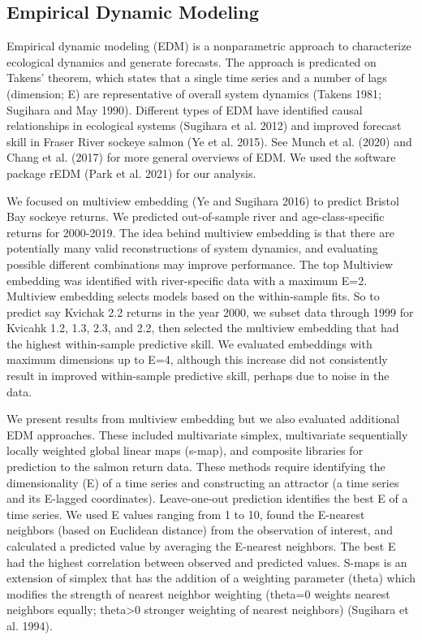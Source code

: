 \documentclass[
]{article}
\begin{document}
\hypertarget{empirical-dynamic-modeling}{%
\subsection*{Empirical Dynamic Modeling}\label{empirical-dynamic-modeling}}

Empirical dynamic modeling (EDM) is a nonparametric approach to characterize ecological dynamics and generate forecasts. The approach is predicated on Takens' theorem, which states that a single time series and a number of lags (dimension; E) are representative of overall system dynamics (Takens 1981; Sugihara and May 1990). Different types of EDM have identified causal relationships in ecological systems (Sugihara et al. 2012) and improved forecast skill in Fraser River sockeye salmon (Ye et al. 2015). See Munch et al. (2020) and Chang et al. (2017) for more general overviews of EDM. We used the software package rEDM (Park et al. 2021) for our analysis.

We focused on multiview embedding (Ye and Sugihara 2016) to predict Bristol Bay sockeye returns. We predicted out-of-sample river and age-class-specific returns for 2000-2019. The idea behind multiview embedding is that there are potentially many valid reconstructions of system dynamics, and evaluating possible different combinations may improve performance. The top Multiview embedding was identified with river-specific data with a maximum E=2. Multiview embedding selects models based on the within-sample fits. So to predict say Kvichak 2.2 returns in the year 2000, we subset data through 1999 for Kvicahk 1.2, 1.3, 2.3, and 2.2, then selected the multiview embedding that had the highest within-sample predictive skill. We evaluated embeddings with maximum dimensions up to E=4, although this increase did not consistently result in improved within-sample predictive skill, perhaps due to noise in the data.

We present results from multiview embedding but we also evaluated additional EDM approaches. These included multivariate simplex, multivariate sequentially locally weighted global linear maps (s-map), and composite libraries for prediction to the salmon return data. These methods require identifying the dimensionality (E) of a time series and constructing an attractor (a time series and its E-lagged coordinates). Leave-one-out prediction identifies the best E of a time series. We used E values ranging from 1 to 10, found the E-nearest neighbors (based on Euclidean distance) from the observation of interest, and calculated a predicted value by averaging the E-nearest neighbors. The best E had the highest correlation between observed and predicted values. S-maps is an extension of simplex that has the addition of a weighting parameter (theta) which modifies the strength of nearest neighbor weighting (theta=0 weights nearest neighbors equally; theta\textgreater0 stronger weighting of nearest neighbors) (Sugihara et al. 1994).
\end{document}
